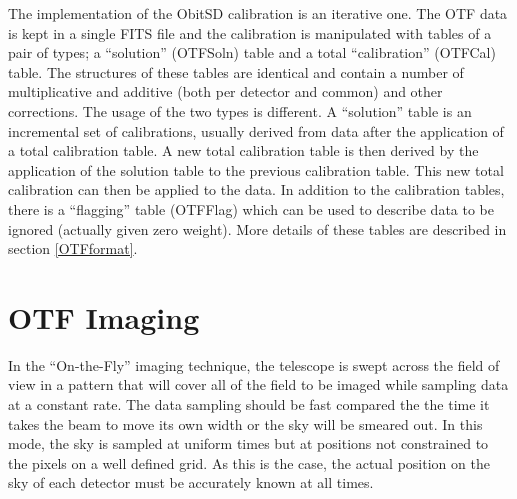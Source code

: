 \documentclass[11pt]{report}
\begin{document}
The implementation of the ObitSD calibration is an iterative one.
The OTF data is kept in a single FITS file and the calibration is
manipulated with tables of a pair of types; a ``solution''
(OTFSoln) table and a total ``calibration'' (OTFCal) table.
The structures of these tables are identical and contain a number of
multiplicative and additive (both per detector and common) and other
corrections.
The usage of the two types is different.
A ``solution'' table is an incremental set of calibrations, usually
derived from data after the application of a total calibration table.
A new total calibration table is then derived by the application of
the solution table to the previous calibration table.
This new total calibration can then be applied to the data.
In addition to the calibration tables, there is a ``flagging''
table (OTFFlag) which can be used to describe data to be ignored
(actually given zero weight).
More details of these tables are described in section
\ref{OTFformat}.

\section{OTF Imaging}
In the ``On-the-Fly'' imaging technique, the telescope is swept across
the field of view in a pattern that will cover all of the field to be
imaged while sampling data at a constant rate.
The data sampling should be fast compared the the time it takes the
beam to move its own width or the sky will be smeared out.
In this mode, the sky is sampled at uniform times but at positions not
constrained to the pixels on a well defined grid.
As this is the case, the actual position on the sky of each detector
must be accurately known at all times.
\end{document}

